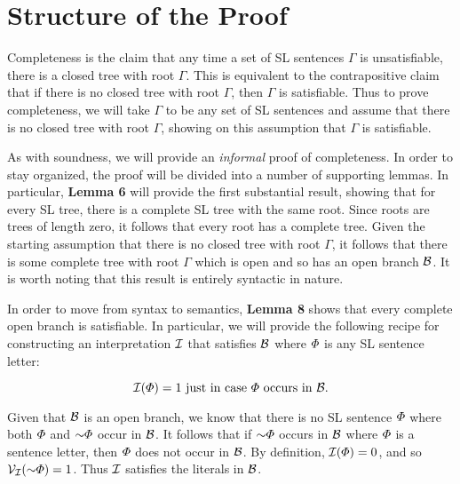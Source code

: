 \section{Structure of the Proof}
\label{sec.completenessproof}

Completeness is the claim that any time a set of SL sentences $\Gamma$ is unsatisfiable, there is a closed tree with root $\Gamma$.
This is equivalent to the contrapositive claim that if there is no closed tree with root $\Gamma$, then $\Gamma$ is satisfiable.
Thus to prove completeness, we will take $\Gamma$ to be any set of SL sentences and assume that there is no closed tree with root $\Gamma$, showing on this assumption that $\Gamma$ is satisfiable.

As with soundness, we will provide an \emph{informal} proof of completeness.
In order to stay organized, the proof will be divided into a number of supporting lemmas.
In particular, \textbf{Lemma 6} will provide the first substantial result, showing that for every SL tree, there is a complete SL tree with the same root.
Since roots are trees of length zero, it follows that every root has a complete tree.
Given the starting assumption that there is no closed tree with root $\Gamma$, it follows that there is some complete tree with root $\Gamma$ which is open and so has an open branch $\mathcal{B}$.
It is worth noting that this result is entirely syntactic in nature.

In order to move from syntax to semantics, \textbf{Lemma 8} shows that every complete open branch is satisfiable.
In particular, we will provide the following recipe for constructing an interpretation $\mathcal{I}$ that satisfies $\mathcal{B}$ where $\varPhi$ is any SL sentence letter:

$$\mathcal{I}(\varPhi)=1 \text{ just in case } \varPhi \text{ occurs in } \mathcal{B}.$$


Given that $\mathcal{B}$ is an open branch, we know that there is no SL sentence $\varPhi$ where both $\varPhi$ and $\enot\metaA$ occur in $\mathcal{B}$.
It follows that if $\enot\metaA$ occurs in $\mathcal{B}$ where $\varPhi$ is a sentence letter, then $\varPhi$ does not occur in $\mathcal{B}$.
By definition, $\mathcal{I}(\varPhi)=0$, and so $\V{\I}(\enot\metaA)=1$.
Thus $\mathcal{I}$ satisfies the literals in $\mathcal{B}$.

